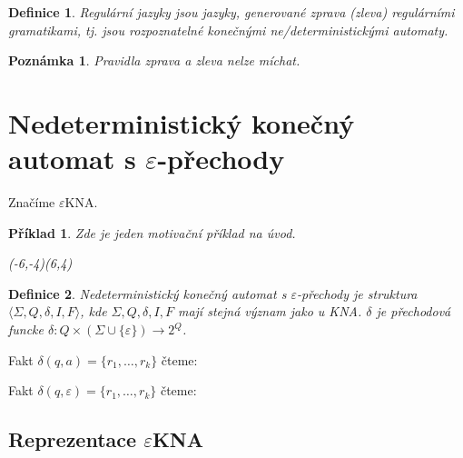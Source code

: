 \documentclass[10pt, a4paper, titlepage]{article}
\theoremstyle{note}
\newtheorem{definice}{Definice}
\newtheorem{priklad}{Příklad}
\newtheorem{poznamka}{Poznámka}
\newcommand{\ekna}{$\varepsilon$KNA}		%
\begin{document}
\begin{definice}
Regulární jazyky jsou jazyky, generované zprava (zleva) regulárními gramatikami, tj. jsou rozpoznatelné konečnými ne/deterministickými automaty.
\end{definice}

\begin{poznamka}
Pravidla zprava a zleva nelze míchat.
\end{poznamka}

\section{Nedeterministický konečný automat s $\varepsilon$-přechody}
Značíme \ekna.
\begin{priklad}\label{priklad-5}
Zde je jeden motivační příklad na úvod.

\begin{center}
\begin{VCPicture}{(-6,-4)(6,4)}
\end{VCPicture}
\end{center}

\end{priklad}

\begin{definice}
Nedeterministický konečný automat s $\varepsilon$-přechody je struktura $ \langle \Sigma,Q,\delta,I,F \rangle $, kde $\Sigma,Q,\delta,I,F$ mají stejná význam jako u KNA. $\delta$ je přechodová funcke $\delta : Q \times (\Sigma \cup \lbrace \varepsilon \rbrace ) \rightarrow 2^Q$.
\end{definice}

Fakt $\delta (q,a) = \lbrace r_1,\ldots,r_k \rbrace $ čteme: 

Fakt $\delta (q,\varepsilon) = \lbrace r_1,\ldots,r_k \rbrace $ čteme: 

\subsection{Reprezentace \ekna}
\end{document}
